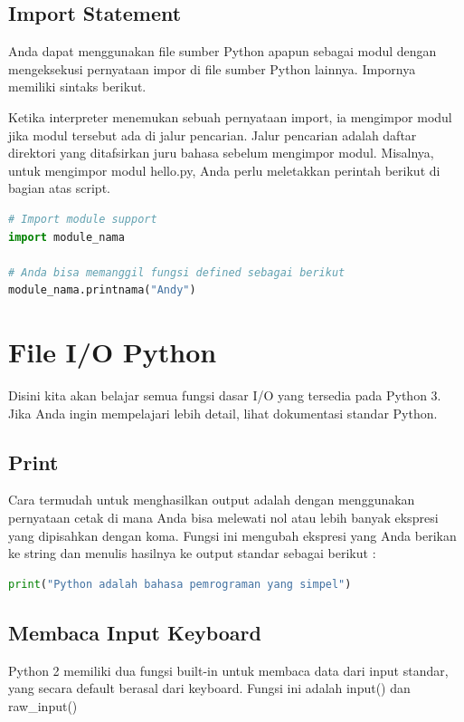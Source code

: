 \subsection{Import Statement}
Anda dapat menggunakan file sumber Python apapun sebagai modul dengan mengeksekusi pernyataan impor di file sumber Python lainnya. Impornya memiliki sintaks berikut.

Ketika interpreter menemukan sebuah pernyataan import, ia mengimpor modul jika modul tersebut ada di jalur pencarian. Jalur pencarian adalah daftar direktori yang ditafsirkan juru bahasa sebelum mengimpor modul. Misalnya, untuk mengimpor modul hello.py, Anda perlu meletakkan perintah berikut di bagian atas script.

\begin{lstlisting}[language=Python]
# Import module support
import module_nama

# Anda bisa memanggil fungsi defined sebagai berikut
module_nama.printnama("Andy")
\end{lstlisting}

\section{File I/O Python}

Disini kita akan belajar semua fungsi dasar I/O yang tersedia pada Python 3. Jika Anda ingin mempelajari lebih detail, lihat dokumentasi standar Python.

\subsection{Print}
Cara termudah untuk menghasilkan output adalah dengan menggunakan pernyataan cetak di mana Anda bisa melewati nol atau lebih banyak ekspresi yang dipisahkan dengan koma. Fungsi ini mengubah ekspresi yang Anda berikan ke string dan menulis hasilnya ke output standar sebagai berikut :

\begin{lstlisting}[language=Python]
print("Python adalah bahasa pemrograman yang simpel")
\end{lstlisting}

\subsection{Membaca Input Keyboard}
Python 2 memiliki dua fungsi built-in untuk membaca data dari input standar, yang secara default berasal dari keyboard. Fungsi ini adalah input() dan raw\_input()

